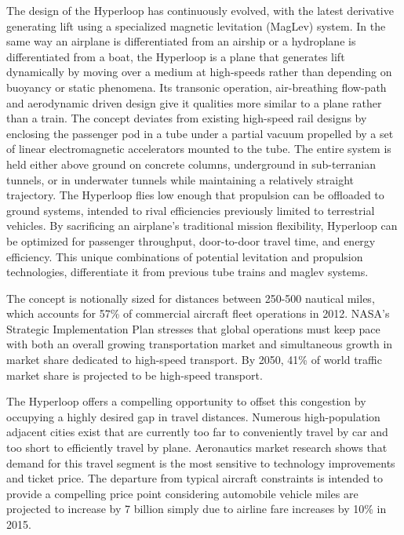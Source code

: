 	The design of the Hyperloop has continuously evolved, with the latest derivative
	generating lift using a specialized magnetic levitation (MagLev) system.
	In the same way an airplane is differentiated from an airship or a hydroplane is differentiated from
	a boat, the Hyperloop is a plane that generates lift dynamically
	by moving over a medium at high-speeds
	rather than depending on buoyancy or static phenomena.
	Its transonic operation, air-breathing flow-path and aerodynamic
	driven design give it qualities more similar to a plane rather than a train.
	The concept deviates from existing high-speed rail designs by enclosing the passenger pod in a tube under a partial vacuum
	propelled by a set of linear electromagnetic accelerators
	mounted to the tube. The entire system is held either above ground on concrete
	columns, underground in sub-terranian tunnels, or in underwater tunnels while maintaining a relatively straight trajectory.
	The Hyperloop flies low enough that propulsion can be offloaded to ground systems,
	intended to rival efficiencies previously limited to terrestrial vehicles.
	By sacrificing an airplane's traditional mission flexibility,
	Hyperloop can be optimized for passenger throughput, door-to-door travel time,
	and energy efficiency.
	This unique combinations of potential levitation and propulsion technologies,
	differentiate it from previous tube trains and maglev systems.

	The concept is notionally sized for distances between 250-500 nautical miles,
	which accounts for 57\% of commercial aircraft fleet operations in 2012. NASA's
	Strategic Implementation Plan stresses that global operations must keep pace with both an overall growing
	transportation market and simultaneous growth in market share dedicated to high-speed transport.
	By 2050, 41\% of world traffic market share is projected to be high-speed transport. \cite{Schafer}

	The Hyperloop offers a compelling opportunity to offset this congestion
	by occupying a highly desired gap in travel distances.
	Numerous high-population adjacent cities exist that are currently
	too far to conveniently travel by car and too short to efficiently travel by plane.
	Aeronautics market research shows that demand for this travel segment is
	the most sensitive to technology improvements and ticket price.\cite{H. Baik}
	The departure from typical aircraft constraints is intended to provide a
	compelling price point considering automobile vehicle miles are
	projected to increase by 7 billion simply due to airline
	fare increases by 10\% in 2015.

